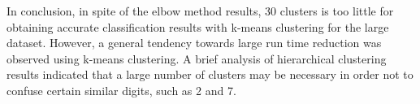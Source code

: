 \documentclass[10pt,a4paper]{article}
\begin{document}
In conclusion, in spite of the elbow method results,
30 clusters is too little for obtaining accurate classification results
with k-means clustering for the large dataset.
However, a general tendency towards large run time reduction was observed
using k-means clustering.
A brief analysis of hierarchical clustering results indicated
that a large number of clusters may be necessary
in order not to confuse certain similar digits, such as 2 and 7.
		
\end{document}
